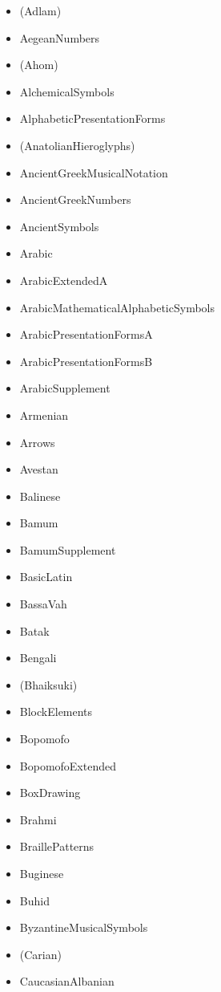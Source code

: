 \documentclass{article}
\newenvironment{itemlist}{%
  \begin{itemize}
  \setlength{\itemsep}{0pt}
  \setlength{\parsep}{0pt}
  \setlength{\topsep}{0pt}
  \setlength{\partopsep}{0pt}
  \setlength{\parskip}{0pt}
  \setlength{\labelsep}{5pt}}%
{
  \end{itemize}}
\begin{document}
    \begin{multicols*}{2}
      \begin{itemlist}
        \item (Adlam)
        \item AegeanNumbers
        \item (Ahom)
        \item AlchemicalSymbols
        \item AlphabeticPresentationForms
        \item (AnatolianHieroglyphs)
        \item AncientGreekMusicalNotation
        \item AncientGreekNumbers
        \item AncientSymbols
        \item Arabic
        \item ArabicExtendedA
        \item ArabicMathematicalAlphabeticSymbols
        \item ArabicPresentationFormsA
        \item ArabicPresentationFormsB
        \item ArabicSupplement
        \item Armenian
        \item Arrows
        \item Avestan
        \item Balinese
        \item Bamum
        \item BamumSupplement
        \item BasicLatin
        \item BassaVah
        \item Batak
        \item Bengali
        \item (Bhaiksuki)
        \item BlockElements
        \item Bopomofo
        \item BopomofoExtended
        \item BoxDrawing
        \item Brahmi
        \item BraillePatterns
        \item Buginese
        \item Buhid
        \item ByzantineMusicalSymbols
        \item (Carian)
        \item CaucasianAlbanian

\end{itemlist}
\end{multicols*}
\end{document}

